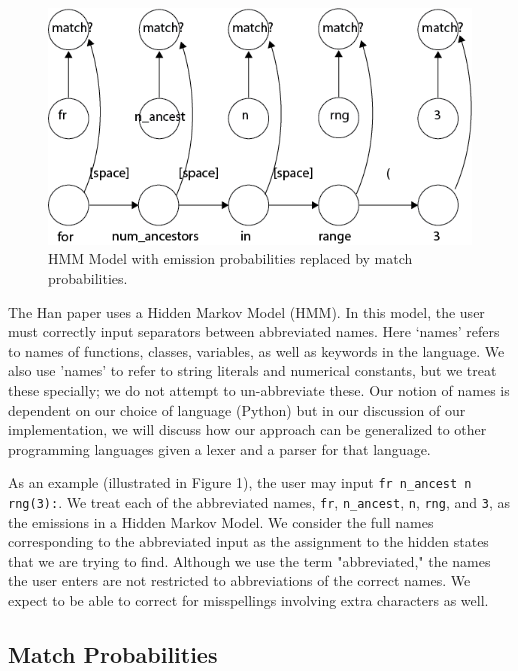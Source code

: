 \documentclass[10pt]{article}
\begin{document}
\begin{figure}[h]
  \centering
    \includegraphics[scale=0.3]{HMM.png}
  \caption{HMM Model with emission probabilities replaced by match probabilities.}
\label{fig:sparselog}
\end{figure}

The Han paper \cite{han} uses a Hidden Markov Model (HMM). In this model, the user must correctly input separators between abbreviated names. Here `names' refers to names of functions, classes, variables, as well as keywords in the language. We also use 'names' to refer to string literals and numerical constants, but we treat these specially; we do not attempt to un-abbreviate these. Our notion of names is dependent on our choice of language (Python) but in our discussion of our implementation, we will discuss how our approach can be generalized to other programming languages given a lexer and a parser for that language. 

	As an example (illustrated in Figure 1), the user may input \texttt{fr n\_ancest n rng(3):}. We treat each of the abbreviated names, \texttt{fr}, \texttt{n\_ancest}, \texttt{n}, \texttt{rng}, and \texttt{3}, as the emissions in a Hidden Markov Model. We consider the full names corresponding to the abbreviated input as the assignment to the hidden states that we are trying to find. Although we use the term "abbreviated," the names the user enters are not restricted to abbreviations of the correct names. We expect to be able to correct for misspellings involving extra characters as well.

\subsection{Match Probabilities}
\end{document}
